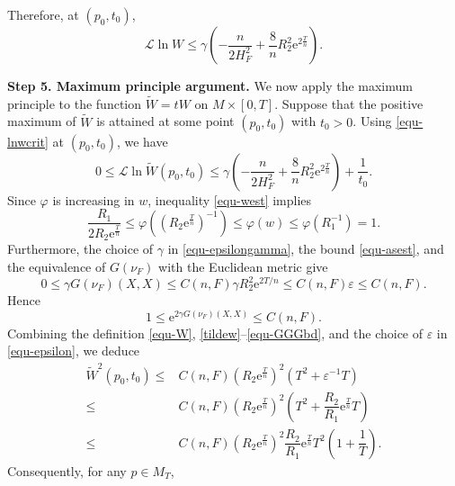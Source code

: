 \documentclass[10pt,a4paper]{amsart}
\numberwithin{equation}{section}
\begin{document}
        Therefore, at $(p_0,t_0)$,
		\begin{equation}
			\mathscr{L}\ln W \leq \gamma\left( -\dfrac{n}{2H_F^2} + \dfrac{8}{n}R_2^2\mathrm{e}^{2\frac{T}{n}} \right). \label{equ-lnwcrit}
		\end{equation}
		
		\textbf{Step 5. Maximum principle argument.}
		We now apply the maximum principle to the function $\tilde{W}=tW$ on $M\times[0,T]$. Suppose that the positive maximum of $\tilde{W}$ is attained at some point $(p_0,t_0)$ with $t_0>0$. Using \eqref{equ-lnwcrit} at $(p_0,t_0)$, we have
		\begin{equation}
			0 \leq \mathscr{L}\ln \tilde{W}(p_0,t_0) \leq  \gamma\left( -\dfrac{n}{2H_F^2} + \dfrac{8}{n}R_2^2\mathrm{e}^{2\frac{T}{n}} \right) + \dfrac{1}{t_0}.
			\label{tildew}
		\end{equation}
		Since $\varphi$ is increasing in $w$, inequality \eqref{equ-west} implies
		\begin{equation*}
			\dfrac{R_1}{2R_2\mathrm{e}^{\frac{T}{n}}} \leq \varphi\left( \left(R_2\mathrm{e}^{\frac{T}{n}}\right)^{-1} \right) \leq\varphi(w) \leq \varphi(R_1^{-1}) = 1.
		\end{equation*}
		Furthermore, the choice of $\gamma$ in \eqref{equ-epsilongamma}, the bound \eqref{equ-asest}, and the equivalence of $G(\nu_F)$ with the Euclidean metric give
		\begin{equation*}
			0\leq \gamma G(\nu_F)(X,X)
			\leq C(n,F)\gamma R_2^2\mathrm{e}^{2T/n}
			\leq C(n,F)\varepsilon
			\leq C(n,F).
		\end{equation*}
		Hence
		\begin{equation}
			1\leq \mathrm{e}^{2\gamma G(\nu_F)(X,X)}\leq C(n,F).
			\label{equ-GGGbd}
		\end{equation}
		Combining the definition \eqref{equ-W}, \eqref{tildew}--\eqref{equ-GGGbd}, and the choice of $\varepsilon$ in \eqref{equ-epsilon}, we deduce
		\begin{align*}
			\tilde{W}^2(p_0,t_0)\leq & C(n,F)\left(R_2\mathrm{e}^{\frac{T}{n}}\right)^2\left( T^2 + \varepsilon^{-1}T \right) \nonumber\\
			\leq & C(n,F)\left(R_2\mathrm{e}^{\frac{T}{n}}\right)^2\left( T^2 + \dfrac{R_2}{R_1}\mathrm{e}^{\frac{T}{n}}T \right)\nonumber\\
			\leq & C(n,F) \left(R_2 \mathrm{e}^{\frac{T}{n}}\right)^2\dfrac{R_2}{R_1}\mathrm{e}^{\frac{T}{n}}T^2\left( 1 + \dfrac{1}{T} \right). \nonumber
		\end{align*}
		Consequently, for any $p\in M_T$,
\end{document}

